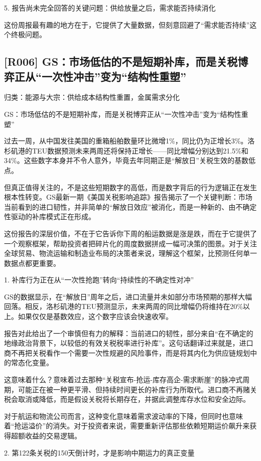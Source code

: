 \documentclass[11pt]{ctexart}
\begin{document}
5. 报告尚未完全回答的关键问题：供给放量之后，需求能否持续消化

这份周报最有趣的地方在于，它提供了大量数据，但刻意回避了“需求能否持续”这个终极问题。

\subsection{[R006] GS：市场低估的不是短期补库，而是关税博弈正从“一次性冲击”变为“结构性重塑”}
{\small\color{refgray}归类：能源与大宗：供给成本结构性重置，金属需求分化}

GS：市场低估的不是短期补库，而是关税博弈正从“一次性冲击”变为“结构性重塑”

过去一周，从中国发往美国的重箱船舶数量环比微增1\%，同比仍为正增长3\%。洛杉矶港的TEU数据预测未来两周还将保持正增长——同比增幅分别达到21.5\%和34\%。这些数字本身并不令人意外，毕竟去年同期正是“解放日”关税生效的基数低点。

但真正值得关注的，不是这些短期数字的高低，而是数字背后的行为逻辑正在发生根本性转变。GS最新一期《美国关税影响追踪》报告揭示了一个关键判断：市场当前看到的进口韧性，并非简单的“解放日效应”被消化，而是一种新的、由不确定性驱动的补库模式正在形成。

这份报告的深层价值，不在于它告诉你下周的船运数据是涨是跌，而在于它提供了一个观察框架，帮助投资者把碎片化的周度数据拼成一幅可决策的图景。对于关注全球贸易、物流运输和制造业布局的决策者来说，理解这个框架，比预测任何单一数据点都更重要。

1. 补库行为正在从“一次性抢跑”转向“持续性的不确定性对冲”

GS的数据显示，在“解放日”周年之后，进口流量并未如部分市场预期的那样大幅回落。相反，洛杉矶港的TEU预测显示，未来两周的同比增幅仍将维持在20\%以上。如果仅仅是基数效应，这个数字应该会快速收窄。

报告对此给出了一个审慎但有力的解释：当前进口的韧性，部分来自“在不确定的地缘政治背景下，以较低的有效关税税率进行补库”。这句话翻译过来就是，进口商不再把关税看作一个需要一次性规避的风险事件，而是将其内化为供应链规划中的常态化变量。

这意味着什么？意味着过去那种“关税宣布-抢运-库存高企-需求断崖”的脉冲式周期，可能正在被一种更平滑、但持续时间更长的补库行为所取代。进口商不再赌关税会取消或降低，而是假设关税将长期存在，并据此调整库存水位和安全边际。

对于航运和物流公司而言，这种变化意味着需求波动率的下降，但同时也意味着“抢运溢价”的消失。对于投资者来说，需要重新评估那些依赖短期运价飙升来获得超额收益的交易逻辑。

2. 第122条关税的150天倒计时，才是影响中期运力的真正变量
\end{document}
